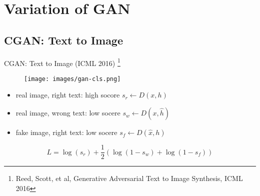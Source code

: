 \documentclass[handout]{beamer}
\begin{document}
\section{Variation of GAN}

\subsection{CGAN: Text to Image}



\begin{frame}[<+->]{CGAN: Text to Image (ICML 2016) \footnote{Reed, Scott, et al, Generative Adversarial Text to Image Synthesis, ICML 2016}}
	\begin{actionenv}
		\begin{figure}
			\centering
			\texttt{[image: images/gan-cls.png]}
		\end{figure}
	\end{actionenv}
	\begin{itemize}
		\item real image, right text: high socore $s_r \leftarrow D(x, h)$
		\item real image, wrong text: low socere $s_w \leftarrow D(x, \hat{h})$
		\item fake image, right text: low socere $s_f \leftarrow D(\hat{x}, h)$
	\end{itemize}
	\begin{actionenv}
		$$L = \log(s_r) + \frac{1}{2}(\log(1-s_w)+\log(1-s_f))$$
	\end{actionenv}
\end{frame}
\end{document}
